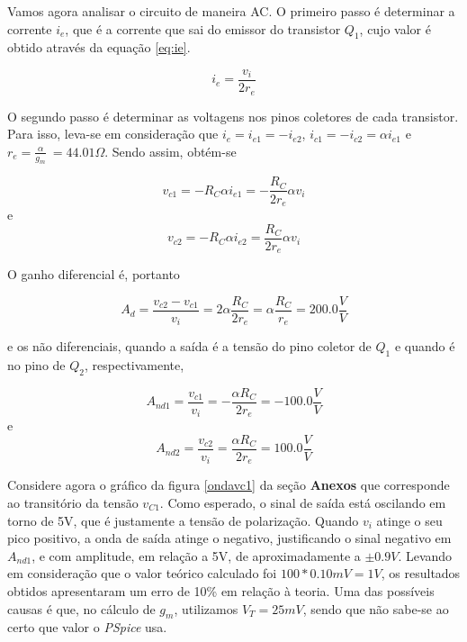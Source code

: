 \documentclass[12pt, a4paper]{article}
\begin{document}
\begin{enumerate}
\begin{table} [h!]
\begin{tabular}{ c | c | c | c }
                \end{tabular}
       \end{table} 
        
      
    Vamos agora analisar o circuito de maneira AC. O primeiro passo é determinar a corrente \(i_e\), que é a corrente que sai do emissor do transistor \(Q_1\), cujo valor é obtido através da equação \ref{eq:ie}.
    
    \begin{equation} \label{eq:ie}
    i_e = \frac{v_i}{2r_e}    
    \end{equation}
    
    O segundo passo é determinar as voltagens nos pinos coletores de cada transistor. Para isso, leva-se em consideração que \(i_e = i_{e1} = -i_{e2}\), \( i_{c1} = - i_{c2} = \alpha i_{e1}\) e \(r_e = \frac{\alpha}{g_m}\ = 44.01 \Omega \). Sendo assim, obtém-se
    
    \[ v_{c1} = -R_C \alpha i_{e1} = - \frac{R_C}{2r_e} \alpha v_i \]
    e
    \[ v_{c2} = -R_C \alpha i_{e2} = \frac{R_C}{2r_e} \alpha v_i \]
    
    O ganho diferencial é, portanto
    
    \begin{equation} \label{eq:gDif}
    A_d = \frac{v_{c2} - v_{c1}}{v_i} = 2\alpha \frac{R_C}{2r_e} = \alpha \frac{R_C}{r_e} = 200.0 \frac{V}{V}
    \end{equation}
    
    e os não diferenciais, quando a saída é a tensão do pino coletor de \(Q_1\) e quando é no pino de \(Q_2\), respectivamente,
    
    \[ A_{nd1} = \frac{v_{c1}}{v_i} = -\frac{\alpha R_C}{2r_e} = -100.0 \frac{V}{V} \]
    e
    \[ A_{nd2} = \frac{v_{c2}}{v_i} = \frac{\alpha R_C}{2r_e} = 100.0 \frac{V}{V} \]
    
    
    Considere agora o gráfico da figura \ref{ondavc1} da seção \textbf{Anexos} que corresponde ao transitório da tensão \(v_{C1}\). Como esperado, o sinal de saída está oscilando em torno de 5V, que é justamente a tensão de polarização. Quando \(v_i\) atinge o seu pico positivo, a onda de saída atinge o negativo, justificando o sinal negativo em \(A_{nd1}\), e com amplitude, em relação a 5V, de aproximadamente a \(\pm 0.9V\). Levando em consideração que o valor teórico calculado foi \(100*0.10 mV = 1V\), os resultados obtidos apresentaram um erro de 10\% em relação à teoria. Uma das possíveis causas é que, no cálculo de \(g_m\), utilizamos \(V_T = 25mV\), sendo que não sabe-se ao certo que valor o \textit{PSpice} usa.
    

\end{enumerate}
\end{document}
